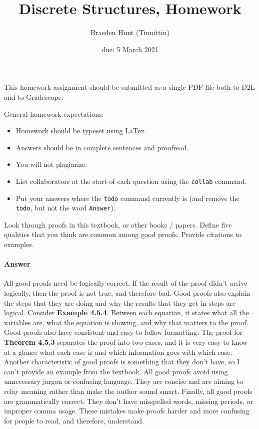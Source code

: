 \documentclass{article}
\title{Discrete Structures, Homework \hwnum}
\author{Braeden Hunt (Tinnittin)}
\date{due: 5 March 2021}
\begin{document}
\maketitle

This homework assignment should be
submitted as a single PDF file both to D2L and to Gradescope.

General homework expectations:
\begin{itemize}
    \item Homework should be typeset using LaTex.
    \item Answers should be in complete sentences and proofread.
    \item You will not plagiarize.
    \item List collaborators at the start of each question using the \texttt{collab} command.
    \item Put your answers where the \texttt{todo} command currently is (and
        remove the \texttt{todo}, but not the word \texttt{Answer}).
\end{itemize}


 

Look through proofs in this textbook, or other books / papers.  Define five
qualities that you think are common among good proofs. Provide citations to
examples.


\paragraph{Answer}

All good proofs need be logically correct. If the result of the proof didn't arrive logically, 
then the proof is not true, and therefore bad. Good proofs also explain the steps that they 
are doing and why the results that they get in steps are logical. Consider \textbf{Example 4.5.4}.
Between each equation, it states what all the variables are, what the equation is showing, and 
why that matters to the proof. Good proofs also have consistent and easy to follow formatting.
The proof for \textbf{Theorem 4.5.3} separates the proof into two cases, and it is very easy to
know at a glance what each case is and which information goes with which case. Another characteristic
of good proofs is something that they don't have, so I can't provide an example from the textbook.
All good proofs avoid using unnecessary jargon or confusing language. They are concise and are
aiming to relay meaning rather than make the author sound smart. Finally, all good proofs are 
grammatically correct. They don't have misspelled words, missing periods, or improper comma usage.
These mistakes make proofs harder and more confusing for people to read, and therefore, understand.
\end{document}
